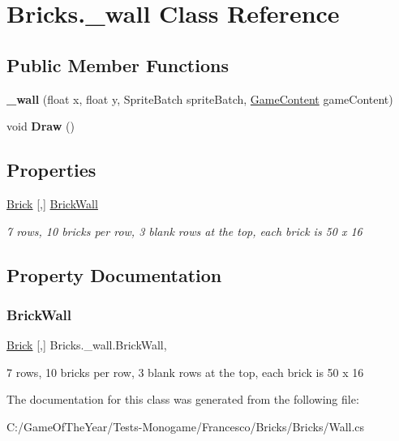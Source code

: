 \hypertarget{class_bricks_1_1__wall}{}\section{Bricks.\+\_\+wall Class Reference}
\label{class_bricks_1_1__wall}
\subsection*{Public Member Functions}
\begin{DoxyCompactItemize}
\item 
\mbox{\label{class_bricks_1_1__wall_a56828950b7357c92f6e526931f9b5f38}} 
{\bfseries \+\_\+wall} (float x, float y, Sprite\+Batch sprite\+Batch, \mbox{\hyperlink{class_bricks_1_1_game_content}{Game\+Content}} game\+Content)
\item 
\mbox{\label{class_bricks_1_1__wall_a0947c586b88503d75abe0fbd3a40454c}} 
void {\bfseries Draw} ()
\end{DoxyCompactItemize}
\subsection*{Properties}
\begin{DoxyCompactItemize}
\item 
\mbox{\hyperlink{class_bricks_1_1_brick}{Brick}} \mbox{[},\mbox{]} \mbox{\hyperlink{class_bricks_1_1__wall_af7deb4c507f3c8a4144d70f2e2f76fc4}{Brick\+Wall}}
\begin{DoxyCompactList}\small\item\em 7 rows, 10 bricks per row, 3 blank rows at the top, each brick is 50 x 16 \end{DoxyCompactList}\end{DoxyCompactItemize}


\subsection{Property Documentation}
\mbox{\label{class_bricks_1_1__wall_af7deb4c507f3c8a4144d70f2e2f76fc4}} 
\subsubsection{\texorpdfstring{BrickWall}{BrickWall}}
{\footnotesize\ttfamily \mbox{\hyperlink{class_bricks_1_1_brick}{Brick}} \mbox{[},\mbox{]} Bricks.\+\_\+wall.\+Brick\+Wall\hspace{0.3cm}{\ttfamily [get]}, {\ttfamily [set]}}



7 rows, 10 bricks per row, 3 blank rows at the top, each brick is 50 x 16 



The documentation for this class was generated from the following file\+:\begin{DoxyCompactItemize}
\item 
C\+:/\+Game\+Of\+The\+Year/\+Tests-\/\+Monogame/\+Francesco/\+Bricks/\+Bricks/Wall.\+cs\end{DoxyCompactItemize}
